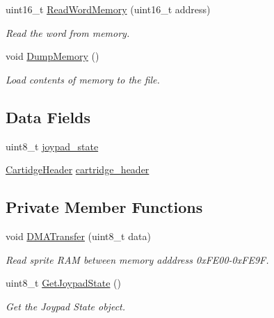\begin{DoxyCompactItemize}
uint16\+\_\+t \mbox{\hyperlink{classMemory_ad314fa06068d46d02aabd53277c24b48}{Read\+Word\+Memory}} (uint16\+\_\+t address)
\begin{DoxyCompactList}\small\item\em Read the word from memory. \end{DoxyCompactList}\item 
\mbox{\label{classMemory_a017768e957671d02872ad12ca3de3e6a}} 
void \mbox{\hyperlink{classMemory_a017768e957671d02872ad12ca3de3e6a}{Dump\+Memory}} ()
\begin{DoxyCompactList}\small\item\em Load contents of memory to the file. \end{DoxyCompactList}\end{DoxyCompactItemize}
\subsection*{Data Fields}
\begin{DoxyCompactItemize}
\item 
uint8\+\_\+t \mbox{\hyperlink{classMemory_a2f955513866ad9611418411e921ac120}{joypad\+\_\+state}}
\item 
\mbox{\hyperlink{structCartidgeHeader}{Cartidge\+Header}} \mbox{\hyperlink{classMemory_a6459c5b106a92a3f24673a3448a1bab0}{cartridge\+\_\+header}}
\end{DoxyCompactItemize}
\subsection*{Private Member Functions}
\begin{DoxyCompactItemize}
\item 
void \mbox{\hyperlink{classMemory_ac486b5f70a08fc36bbda8e101e4ab635}{D\+M\+A\+Transfer}} (uint8\+\_\+t data)
\begin{DoxyCompactList}\small\item\em Read sprite R\+AM between memory adddress 0x\+F\+E00-\/0x\+F\+E9F. \end{DoxyCompactList}\item 
uint8\+\_\+t \mbox{\hyperlink{classMemory_a10b757f7584012b719b3c81aa2688858}{Get\+Joypad\+State}} ()
\begin{DoxyCompactList}\small\item\em Get the Joypad State object. \end{DoxyCompactList}\end{DoxyCompactItemize}

